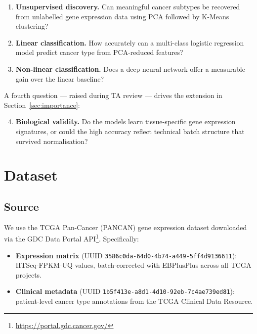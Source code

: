 \documentclass[11pt,letterpaper]{article}
\begin{document}
\begin{enumerate}[leftmargin=2em,itemsep=1pt]
  \item \textbf{Unsupervised discovery.}  Can meaningful cancer subtypes be
        recovered from unlabelled gene expression data using PCA followed by
        K-Means clustering?
  \item \textbf{Linear classification.}  How accurately can a multi-class
        logistic regression model predict cancer type from PCA-reduced features?
  \item \textbf{Non-linear classification.}  Does a deep neural network offer
        a measurable gain over the linear baseline?
\end{enumerate}

A fourth question --- raised during TA review --- drives the extension in
Section~\ref{sec:importance}:

\begin{enumerate}[leftmargin=2em,itemsep=1pt]
  \setcounter{enumi}{3}
  \item \textbf{Biological validity.}  Do the models learn tissue-specific gene
        expression signatures, or could the high accuracy reflect technical
        batch structure that survived normalisation?
\end{enumerate}

\section{Dataset}
\label{sec:dataset}

\subsection{Source}

We use the TCGA Pan-Cancer (PANCAN) gene expression dataset downloaded via the
GDC Data Portal API\footnote{\url{https://portal.gdc.cancer.gov/}}.
Specifically:

\begin{itemize}[leftmargin=2em,itemsep=1pt]
  \item \textbf{Expression matrix} (UUID
        \texttt{3586c0da-64d0-4b74-a449-5ff4d9136611}):
        HTSeq-FPKM-UQ values, batch-corrected with EBPlusPlus across all TCGA
        projects.
  \item \textbf{Clinical metadata} (UUID
        \texttt{1b5f413e-a8d1-4d10-92eb-7c4ae739ed81}):
        patient-level cancer type annotations from the TCGA Clinical Data
        Resource.
\end{itemize}
\end{document}
